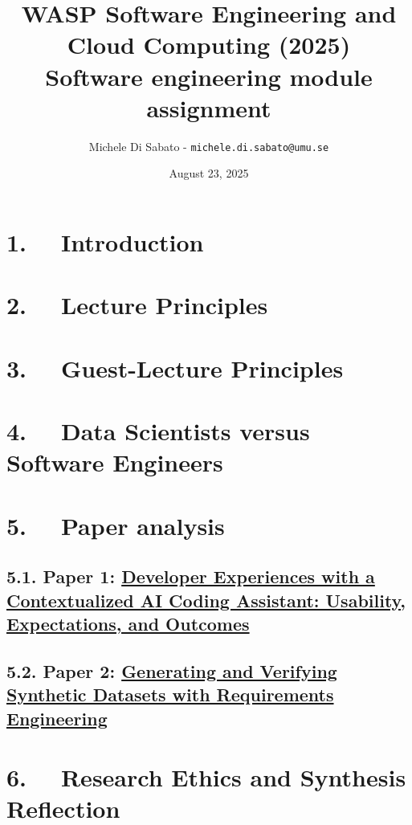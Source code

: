 \documentclass[11pt]{article}
\title{WASP Software Engineering and Cloud Computing (2025)\\
Software engineering module assignment}
\author{Michele Di Sabato - \texttt{michele.di.sabato@umu.se}}
\date{\vspace{-0.5em}August 23, 2025}
\begin{document}
\maketitle

\section*{1. \ \ Introduction}


\section*{2. \ \ Lecture Principles}


\section*{3. \ \ Guest-Lecture Principles}


\section*{4. \ \ Data Scientists versus Software Engineers}


\newpage
\section*{5. \ \ Paper analysis}
\subsection*{5.1. Paper 1: \href{https://conf.researchr.org/details/cain-2024/cain-2024-call-for-papers/9/Developer-Experiences-with-a-Contextualized-AI-Coding-Assistant-Usability-Expectati}{Developer Experiences with a Contextualized AI Coding Assistant: Usability, Expectations, and Outcomes}}


\subsection*{5.2. Paper 2: \href{https://conf.researchr.org/details/cain-2025/cain-2025-call-for-papers/11/Generating-and-Verifying-Synthetic-Datasets-with-Requirements-Engineering}{Generating and Verifying Synthetic Datasets with Requirements Engineering}}


\section*{6. \ \ Research Ethics and Synthesis Reflection}




\end{document}
